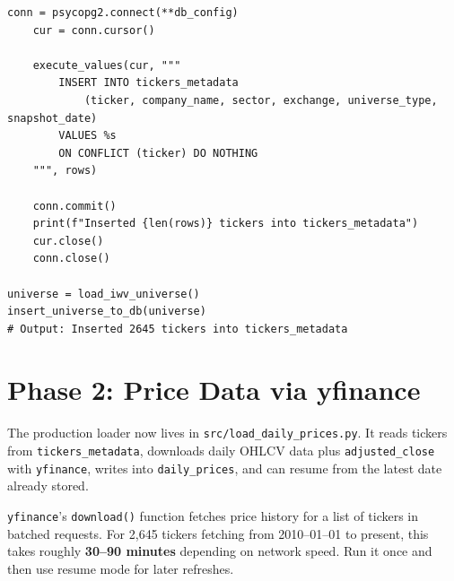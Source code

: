 \documentclass[11pt, oneside]{book}
\begin{document}
\begin{lstlisting}[style=pythonstyle, caption={Loading IWV CSV Directly into PostgreSQL}]
    conn = psycopg2.connect(**db_config)
    cur = conn.cursor()

    execute_values(cur, """
        INSERT INTO tickers_metadata
            (ticker, company_name, sector, exchange, universe_type, snapshot_date)
        VALUES %s
        ON CONFLICT (ticker) DO NOTHING
    """, rows)

    conn.commit()
    print(f"Inserted {len(rows)} tickers into tickers_metadata")
    cur.close()
    conn.close()

universe = load_iwv_universe()
insert_universe_to_db(universe)
# Output: Inserted 2645 tickers into tickers_metadata
\end{lstlisting}

\section{Phase 2: Price Data via yfinance}

The production loader now lives in \texttt{src/load\_daily\_prices.py}. It reads tickers from \texttt{tickers\_metadata}, downloads daily OHLCV data plus \texttt{adjusted\_close} with \texttt{yfinance}, writes into \texttt{daily\_prices}, and can resume from the latest date already stored.

\texttt{yfinance}'s \texttt{download()} function fetches price history for a list of tickers in batched requests. For 2,645 tickers fetching from 2010--01--01 to present, this takes roughly \textbf{30--90 minutes} depending on network speed. Run it once and then use resume mode for later refreshes.
\end{document}
